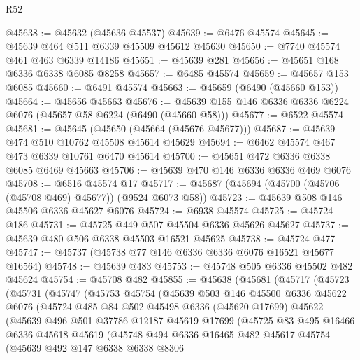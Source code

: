 \begin{lexlean}{R52}
\begin{coremodule}
@45638 := @45632 (@45636 @45537)
@45639 := @6476 @45574
@45645 := @45639 @464 @511 @6339 @45509 @45612 @45630
@45650 := @7740 @45574 @461 @463 @6339 @14186
@45651 := @45639 @281
@45656 := @45651 @168 @6336 @6338 @6085 @8258
@45657 := @6485 @45574
@45659 := @45657 @153 @6085
@45660 := @6491 @45574
@45663 := @45659 (@6490 (@45660 @153))
@45664 := @45656 @45663
@45676 := @45639 @155 @146 @6336 @6336 @6224 @6076 (@45657 @58 @6224 (@6490 (@45660 @58)))
@45677 := @6522 @45574
@45681 := @45645 (@45650 (@45664 (@45676 @45677)))
@45687 := @45639 @474 @510 @10762 @45508 @45614 @45629
@45694 := @6462 @45574 @467 @473 @6339 @10761 @6470 @45614
@45700 := @45651 @472 @6336 @6338 @6085 @6469 @45663
@45706 := @45639 @470 @146 @6336 @6336 @469 @6076
@45708 := @6516 @45574 @17
@45717 := @45687 (@45694 (@45700 (@45706 (@45708 @469) @45677)) (@9524 @6073 @58))
@45723 := @45639 @508 @146 @45506 @6336 @45627 @6076
@45724 := @6938 @45574
@45725 := @45724 @186
@45731 := @45725 @449 @507 @45504 @6336 @45626 @45627
@45737 := @45639 @480 @506 @6338 @45503 @16521 @45625
@45738 := @45724 @477
@45747 := @45737 (@45738 @77 @146 @6336 @6336 @6076 @16521 @45677 @16564)
@45748 := @45639 @483
@45753 := @45748 @505 @6336 @45502 @482 @45624
@45754 := @45708 @482
@45855 := @45638
    (@45681
      (@45717
        (@45723
          (@45731
            (@45747
              (@45753
                @45754
                (@45639
                  @503
                  @146
                  @45500
                  @6336
                  @45622
                  @6076
                  (@45724
                    @485
                    @84
                    @502
                    @45498
                    @6336
                    (@45620 @17699)
                    @45622
                    (@45639
                      @496
                      @501
                      @37786
                      @12187
                      @45619
                      @17699
                      (@45725
                        @83
                        @495
                        @16466
                        @6336
                        @45618
                        @45619
                        (@45748
                          @494
                          @6336
                          @16465
                          @482
                          @45617
                          @45754
                          (@45639
                            @492
                            @147
                            @6338
                            @6338
                            @8306

\end{coremodule}
\end{lexlean}
